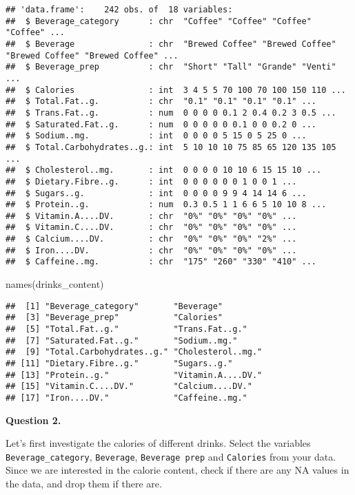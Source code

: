 \documentclass[
]{article}
\newenvironment{Shaded}{\begin{snugshade}}{\end{snugshade}}
\newcommand{\FunctionTok}[1]{\textcolor[rgb]{0.00,0.00,0.00}{#1}}
\newcommand{\NormalTok}[1]{#1}
\begin{document}
\begin{verbatim}
## 'data.frame':    242 obs. of  18 variables:
##  $ Beverage_category      : chr  "Coffee" "Coffee" "Coffee" "Coffee" ...
##  $ Beverage               : chr  "Brewed Coffee" "Brewed Coffee" "Brewed Coffee" "Brewed Coffee" ...
##  $ Beverage_prep          : chr  "Short" "Tall" "Grande" "Venti" ...
##  $ Calories               : int  3 4 5 5 70 100 70 100 150 110 ...
##  $ Total.Fat..g.          : chr  "0.1" "0.1" "0.1" "0.1" ...
##  $ Trans.Fat..g.          : num  0 0 0 0 0.1 2 0.4 0.2 3 0.5 ...
##  $ Saturated.Fat..g.      : num  0 0 0 0 0 0.1 0 0 0.2 0 ...
##  $ Sodium..mg.            : int  0 0 0 0 5 15 0 5 25 0 ...
##  $ Total.Carbohydrates..g.: int  5 10 10 10 75 85 65 120 135 105 ...
##  $ Cholesterol..mg.       : int  0 0 0 0 10 10 6 15 15 10 ...
##  $ Dietary.Fibre..g.      : int  0 0 0 0 0 0 1 0 0 1 ...
##  $ Sugars..g.             : int  0 0 0 0 9 9 4 14 14 6 ...
##  $ Protein..g.            : num  0.3 0.5 1 1 6 6 5 10 10 8 ...
##  $ Vitamin.A....DV.       : chr  "0%" "0%" "0%" "0%" ...
##  $ Vitamin.C....DV.       : chr  "0%" "0%" "0%" "0%" ...
##  $ Calcium....DV.         : chr  "0%" "0%" "0%" "2%" ...
##  $ Iron....DV.            : chr  "0%" "0%" "0%" "0%" ...
##  $ Caffeine..mg.          : chr  "175" "260" "330" "410" ...
\end{verbatim}

\begin{Shaded}
\begin{Highlighting}[]
\FunctionTok{names}\NormalTok{(drinks\_content)}
\end{Highlighting}
\end{Shaded}

\begin{verbatim}
##  [1] "Beverage_category"       "Beverage"               
##  [3] "Beverage_prep"           "Calories"               
##  [5] "Total.Fat..g."           "Trans.Fat..g."          
##  [7] "Saturated.Fat..g."       "Sodium..mg."            
##  [9] "Total.Carbohydrates..g." "Cholesterol..mg."       
## [11] "Dietary.Fibre..g."       "Sugars..g."             
## [13] "Protein..g."             "Vitamin.A....DV."       
## [15] "Vitamin.C....DV."        "Calcium....DV."         
## [17] "Iron....DV."             "Caffeine..mg."
\end{verbatim}

\textbf{Question 2.}

Let's first investigate the calories of different drinks. Select the
variables \texttt{Beverage\_category}, \texttt{Beverage},
\texttt{Beverage\ prep} and \texttt{Calories} from your data. Since we
are interested in the calorie content, check if there are any NA values
in the data, and drop them if there are.
\end{document}
